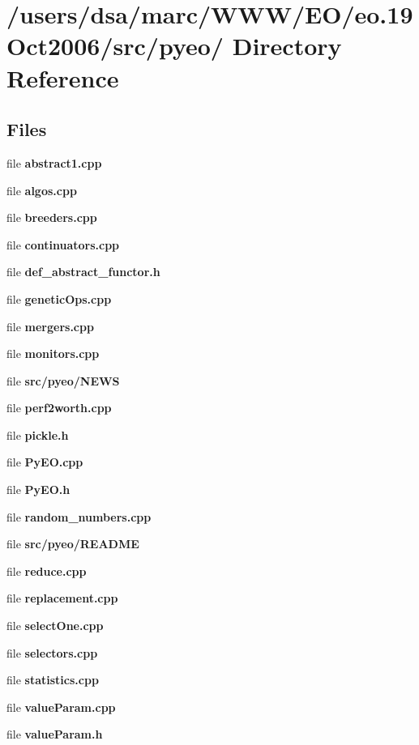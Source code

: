 \section{/users/dsa/marc/WWW/EO/eo.19Oct2006/src/pyeo/ Directory Reference}
\label{dir_000001}
\subsection*{Files}
\begin{CompactItemize}
\item 
file {\bf abstract1.cpp}
\item 
file {\bf algos.cpp}
\item 
file {\bf breeders.cpp}
\item 
file {\bf continuators.cpp}
\item 
file {\bf def_abstract_functor.h}
\item 
file {\bf geneticOps.cpp}
\item 
file {\bf mergers.cpp}
\item 
file {\bf monitors.cpp}
\item 
file {\bf src/pyeo/NEWS}
\item 
file {\bf perf2worth.cpp}
\item 
file {\bf pickle.h}
\item 
file {\bf PyEO.cpp}
\item 
file {\bf PyEO.h}
\item 
file {\bf random_numbers.cpp}
\item 
file {\bf src/pyeo/README}
\item 
file {\bf reduce.cpp}
\item 
file {\bf replacement.cpp}
\item 
file {\bf selectOne.cpp}
\item 
file {\bf selectors.cpp}
\item 
file {\bf statistics.cpp}
\item 
file {\bf valueParam.cpp}
\item 
file {\bf valueParam.h}
\end{CompactItemize}
